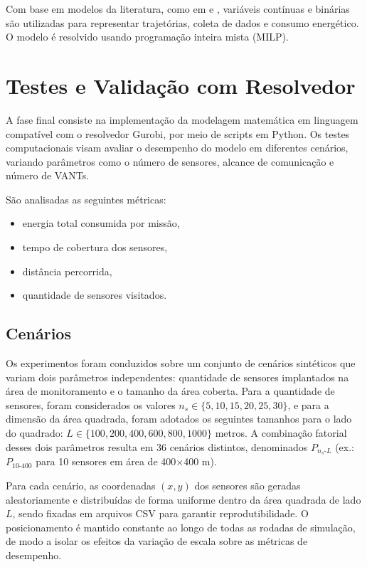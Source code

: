 Com base em modelos da literatura, como em \cite{liu2018uavWSN} e \cite{zhang2018drlrvc}, variáveis contínuas e binárias são utilizadas para representar trajetórias, coleta de dados e consumo energético. O modelo é resolvido usando programação inteira mista (MILP).

\section{Testes e Validação com Resolvedor}

A fase final consiste na implementação da modelagem matemática em linguagem compatível com o resolvedor Gurobi, por meio de scripts em Python. Os testes computacionais visam avaliar o desempenho do modelo em diferentes cenários, variando parâmetros como o número de sensores, alcance de comunicação e número de VANTs.

São analisadas as seguintes métricas:

\begin{itemize}
\item energia total consumida por missão,
\item tempo de cobertura dos sensores,
\item distância percorrida,
\item quantidade de sensores visitados.
\end{itemize}

\subsection{Cenários}
Os experimentos foram conduzidos sobre um conjunto de cenários sintéticos que variam dois parâmetros independentes: quantidade de sensores implantados na área de monitoramento e o tamanho da área coberta. Para a quantidade de sensores, foram considerados os valores $n_s \in \{5, 10, 15, 20, 25, 30\}$, e para a dimensão da área quadrada, foram adotados os seguintes tamanhos para o lado do quadrado: $L \in \{100, 200, 400, 600, 800, 1000\}$ metros. A combinação fatorial desses dois parâmetros resulta em 36 cenários distintos, denominados $P_{n_s\text{-}L}$ (ex.: $P_{10\text{-}400}$ para 10 sensores em área de 400×400 m).

Para cada cenário, as coordenadas $(x, y)$ dos sensores são geradas aleatoriamente e distribuídas de forma uniforme dentro da área quadrada de lado $L$, sendo fixadas em arquivos CSV para garantir reprodutibilidade. O posicionamento é mantido constante ao longo de todas as rodadas de simulação, de modo a isolar os efeitos da variação de escala sobre as métricas de desempenho.

